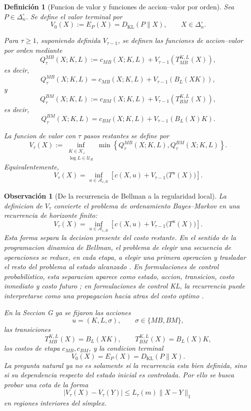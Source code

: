 ﻿\documentclass[12pt]{article}
\newtheorem{definicion}{Definición}[section]
\newtheorem{observacion}{Observación}[section]
\begin{document}
\begin{definicion}[Funcion de valor y funciones de accion--valor por orden]\label{def:valor_Q_ordenamiento}
Sea \(P\in\Delta_n^\circ\). Se define el valor terminal por
\[
V_0(X)
:=
E_P(X)
=
D_{\mathrm{KL}}(P\|X),
\qquad
X\in\Delta_n^\circ.
\]

Para \(\tau\ge 1\), suponiendo definida \(V_{\tau-1}\), se definen las funciones de accion--valor por orden mediante
\[
Q_\tau^{MB}(X;K,L)
:=
c_{MB}(X;K,L)
+
V_{\tau-1}\!\left(T_{MB}^{K,L}(X)\right),
\]
es decir,
\[
Q_\tau^{MB}(X;K,L)
=
c_{MB}(X;K,L)
+
V_{\tau-1}\!\left(B_L(XK)\right),
\]
y
\[
Q_\tau^{BM}(X;K,L)
:=
c_{BM}(X;K,L)
+
V_{\tau-1}\!\left(T_{BM}^{K,L}(X)\right),
\]
es decir,
\[
Q_\tau^{BM}(X;K,L)
=
c_{BM}(X;K,L)
+
V_{\tau-1}\!\left(B_L(X)K\right).
\]

La funcion de valor con \(\tau\) pasos restantes se define por
\[
V_\tau(X)
:=
\inf_{\substack{K\in\mathcal K_\varepsilon\\ \log L\in\mathcal U_R}}
\min
\left\{
Q_\tau^{MB}(X;K,L),
Q_\tau^{BM}(X;K,L)
\right\}.
\]
Equivalentemente,
\[
V_\tau(X)
=
\inf_{u\in\mathcal A_{\varepsilon,R}}
\left[
c(X,u)
+
V_{\tau-1}\bigl(T^u(X)\bigr)
\right].
\]
\end{definicion}

\begin{observacion}[De la recurrencia de Bellman a la regularidad local]\label{obs:bellman_regularidad_local}
La definicion de \(V_\tau\) convierte el problema de ordenamiento Bayes--Markov en una recurrencia de horizonte finito:
\[
V_\tau(X)
=
\inf_{u\in\mathcal A_{\varepsilon,R}}
\left[
c(X,u)+V_{\tau-1}\bigl(T^u(X)\bigr)
\right].
\]
Esta forma separa la decision presente del costo restante. En el sentido de la programacion dinamica de Bellman, el problema de elegir una secuencia de operaciones se reduce, en cada etapa, a elegir una primera operacion y trasladar el resto del problema al estado alcanzado \citep{ref18}. En formulaciones de control probabilistico, esta separacion aparece como estado, accion, transicion, costo inmediato y costo futuro \citep{Todorov2009EfficientComputationOptimalActions}; en formulaciones de control KL, la recurrencia puede interpretarse como una propagacion hacia atras del costo optimo \citep{KappenGomezOpper2012OptimalControlAsAGraphicalModelInferenceProblem}.

En la Seccion G ya se fijaron las acciones
\[
u=(K,L,\sigma),
\qquad
\sigma\in\{MB,BM\},
\]
las transiciones
\[
T_{MB}^{K,L}(X)=B_L(XK),
\qquad
T_{BM}^{K,L}(X)=B_L(X)K,
\]
los costos de etapa \(c_{MB},c_{BM}\), y la condicion terminal
\[
V_0(X)=E_P(X)=D_{\mathrm{KL}}(P\|X).
\]
La pregunta natural ya no es solamente si la recurrencia esta bien definida, sino si su dependencia respecto del estado inicial es controlada. Por ello se busca probar una cota de la forma
\[
|V_\tau(X)-V_\tau(Y)|
\le
L_\tau(m)\|X-Y\|_1
\]
en regiones interiores del símplex.
\end{observacion}
\end{document}

